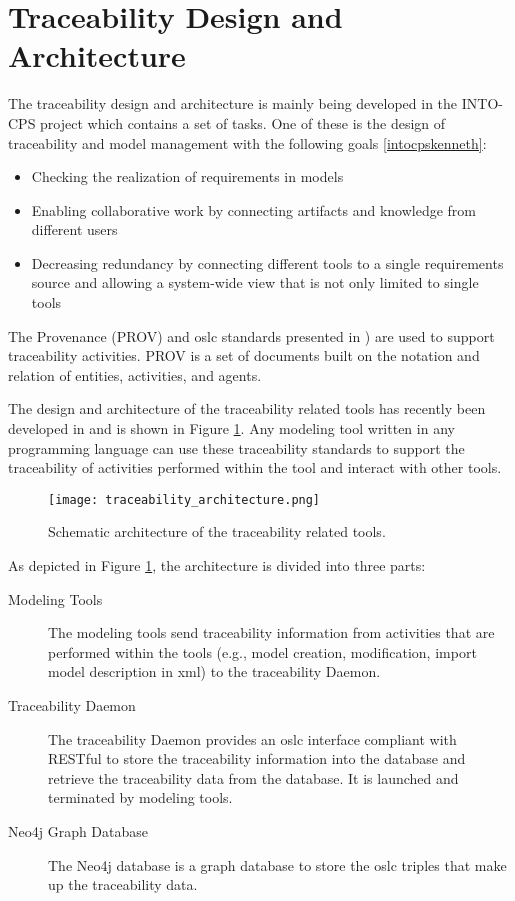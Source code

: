 \section{Traceability Design and Architecture}
\label{sec:tracaebilitydesign}


The traceability design and architecture is mainly being developed in the INTO-CPS project \cite{intocpspaper,intocps} 
which contains a set of tasks. One of these is the design of traceability and model management with the following goals \ref{intocpskenneth}:

\begin{itemize}
\item Checking the realization of requirements in models
\item Enabling collaborative work by connecting artifacts and knowledge from different users
\item Decreasing redundancy by connecting different tools to a single requirements source and allowing
a system-wide view that is not only limited to single tools
\end{itemize}

The Provenance (PROV) \cite{provluc} and \acrshort{oslc} standards presented in \cite{intocpsjohn})
are used to support traceability activities. PROV is a set of documents built on the notation and relation of
entities, activities, and agents.

The design and architecture of the traceability related tools has recently been developed in \cite{intocpskenneth} and is shown in Figure  \ref{fig:traceabilityarchitecture}. Any modeling tool written in any programming language can use these traceability standards to support the traceability of activities performed within the tool and interact with other tools.

\begin{figure}
	\texttt{[image: traceability\_architecture.png]}
	\caption{Schematic architecture of the traceability related tools.}
	\label{fig:traceabilityarchitecture}
\end{figure}


As depicted in Figure \ref{fig:traceabilityarchitecture}, the architecture is divided into three parts:

\begin{description}
\item[Modeling Tools] The modeling tools send traceability information from activities that are performed within the tools (e.g., model creation,
modification, import model description in \acrshort{xml}) to the traceability Daemon.
\item[Traceability Daemon] The traceability Daemon provides an \acrshort{oslc} interface compliant with RESTful \cite{restfulleonardo} to store the traceability 
information into the database and retrieve the traceability data from the database. It is launched and terminated by modeling tools.
\item[Neo4j Graph Database] The Neo4j database \cite{neo4j} is a graph database to store the \acrshort{oslc} triples that make up the traceability data. 

\end{description}

